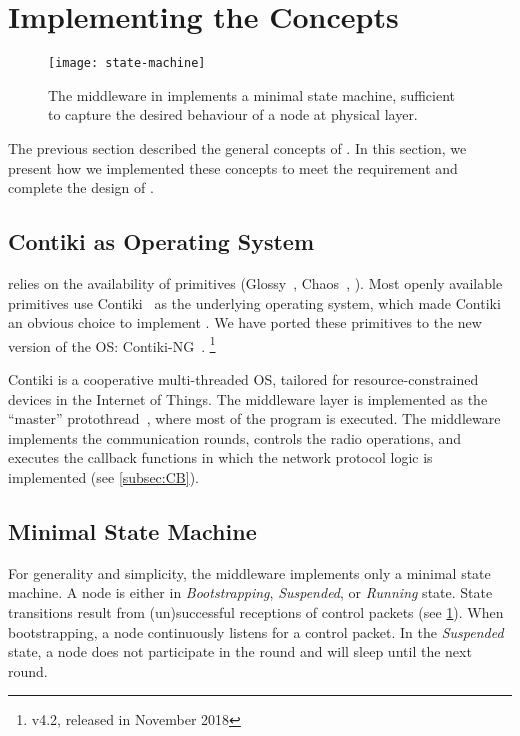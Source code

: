 \section{Implementing the Concepts}
\label{sec:baloo_implementation}

\begin{figure}
	\centering
	\texttt{[image: state-machine]}
	\caption{The middleware in \baloo implements a minimal state machine, sufficient to capture the desired behaviour of a node at physical layer.
		}
	\label{fig:state-machine}
	\vspace{-0.5cm}
\end{figure}

The previous section described the general concepts of \baloo.
In this section, we present how we implemented these concepts to meet the  requirement and complete the design of \baloo.

\subsection{Contiki as Operating System}
\label{subsec:contiki}


\baloo relies on the availability of \ST primitives (\eg Glossy~\cite{ferrari2011Glossy}, Chaos~\cite{landsiedel2013Chaos}, \etc). Most openly available primitives use Contiki~\cite{dunkels2004Contiki} as the underlying operating system, which made Contiki an obvious choice to implement \baloo.
We have ported these primitives to the new version of the OS: Contiki-NG~\cite{ContikiNG}.%
\footnote{v4.2, released in November 2018}

Contiki is a cooperative multi-threaded OS, tailored for resource-constrained devices in the Internet of Things.
The middleware layer is implemented as the ``master'' protothread~\cite{dunkels2006Protothreads}, where most of the program is executed. The middleware implements the communication rounds, controls the radio operations, and executes the callback functions in which the network protocol logic is implemented (see \cref{subsec:CB}).


\subsection{Minimal State Machine}
\label{subsec:state-machine}
For generality and simplicity, the middleware implements only a minimal state machine. A node is either in \textsl{Bootstrapping}, \textsl{Suspended}, or \textsl{Running} state.
State transitions result from (un)successful receptions of control packets (see \cref{fig:state-machine}).
When bootstrapping, a node continuously listens for a control packet. In the \textsl{Suspended} state, a node does not participate in the round and will sleep until the next round.

